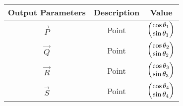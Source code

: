  \begin{tabular}{|c|c|c|}
    \hline
        \textbf{Output Parameters} &\textbf{Description} &\textbf{Value} \\
\hline
          $\vec{P}$ & Point &$\begin{pmatrix}\cos{\theta_1}\\\sin{\theta_1}\end{pmatrix}$ \\

         \hline
          $\vec{Q}$ & Point &$\begin{pmatrix}\cos{\theta_2}\\\sin{\theta_2}\end{pmatrix}$ \\
         \hline
          $\vec{R}$ & Point &$\begin{pmatrix}\cos{\theta_3}\\\sin{\theta_3}\end{pmatrix}$ \\
         \hline
          $\vec{S}$ & Point &$\begin{pmatrix}\cos{\theta_4}\\\sin{\theta_4}\end{pmatrix}$ \\
         \hline
    \end{tabular}


